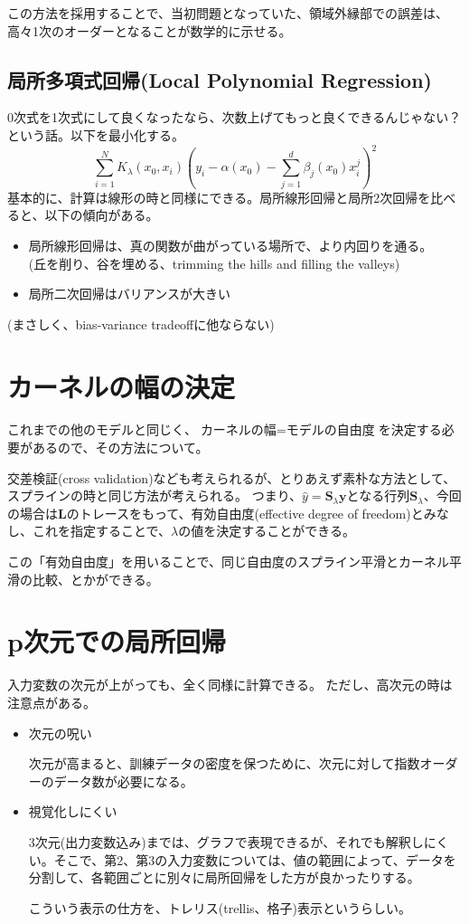 \documentclass{jsarticle}
\begin{document}
この方法を採用することで、当初問題となっていた、領域外縁部での誤差は、高々1次のオーダーとなることが数学的に示せる。

\subsection{局所多項式回帰(Local Polynomial Regression)}
0次式を1次式にして良くなったなら、次数上げてもっと良くできるんじゃない？という話。以下を最小化する。
\[
  \sum_{i=1}^{N}K_{\lambda}(x_{0},x_{i}) \left (y_{i}- \alpha (x_{0})- \sum_{j=1}^{d}\beta_{j} (x_{0})x_{i}^{j} \right )^{2}
\]
基本的に、計算は線形の時と同様にできる。局所線形回帰と局所2次回帰を比べると、以下の傾向がある。
\begin{itemize}
  \item 局所線形回帰は、真の関数が曲がっている場所で、より内回りを通る。\\(丘を削り、谷を埋める、trimming the hills and filling the valleys)
  \item 局所二次回帰はバリアンスが大きい
\end{itemize}
(まさしく、bias-variance tradeoffに他ならない)

\section{カーネルの幅の決定}
これまでの他のモデルと同じく、$\mbox{カーネルの幅}=\mbox{モデルの自由度}$を決定する必要があるので、その方法について。

交差検証(cross validation)なども考えられるが、とりあえず素朴な方法として、スプラインの時と同じ方法が考えられる。
つまり、$\hat{y}=\mathbf{S}_{\lambda}\mathbf{y}$となる行列$\mathbf{S}_{\lambda}$、今回の場合は$\mathbf{L}$のトレースをもって、有効自由度(effective degree of freedom)とみなし、これを指定することで、$\lambda$の値を決定することができる。

この「有効自由度」を用いることで、同じ自由度のスプライン平滑とカーネル平滑の比較、とかができる。

\section{p次元での局所回帰}
入力変数の次元が上がっても、全く同様に計算できる。
ただし、高次元の時は注意点がある。
\begin{itemize}
  \item 次元の呪い

  次元が高まると、訓練データの密度を保つために、次元に対して指数オーダーのデータ数が必要になる。

  \item 視覚化しにくい

  3次元(出力変数込み)までは、グラフで表現できるが、それでも解釈しにくい。そこで、第2、第3の入力変数については、値の範囲によって、データを分割して、各範囲ごとに別々に局所回帰をした方が良かったりする。

  こういう表示の仕方を、トレリス(trellis、格子)表示というらしい。
\end{itemize}
\end{document}
